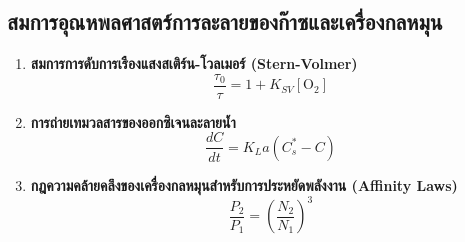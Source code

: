 \subsection{สมการอุณหพลศาสตร์การละลายของก๊าซและเครื่องกลหมุน}
\begin{enumerate}
    \item \textbf{สมการการดับการเรืองแสงสเติร์น-โวลเมอร์ (Stern-Volmer)}
    \begin{equation}
    \frac{\tau_0}{\tau} = 1 + K_{SV} [\text{O}_2]
    \end{equation}
    \item \textbf{การถ่ายเทมวลสารของออกซิเจนละลายน้ำ}
    \begin{equation}
    \frac{dC}{dt} = K_L a \left( C^*_s - C \right)
    \end{equation}
    \item \textbf{กฎความคล้ายคลึงของเครื่องกลหมุนสำหรับการประหยัดพลังงาน (Affinity Laws)}
    \begin{equation}
    \frac{P_2}{P_1} = \left( \frac{N_2}{N_1} \right)^3
    \end{equation}
\end{enumerate}
\clearpage
